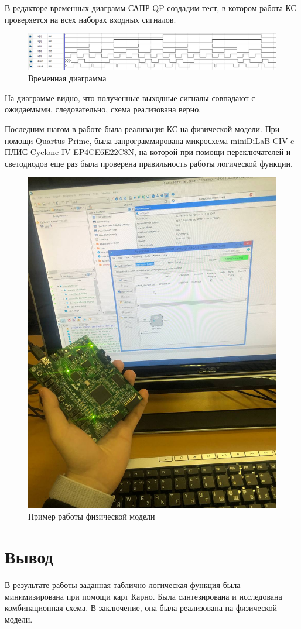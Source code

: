 \documentclass[a4paper,12pt]{article}
\begin{document}
	В редакторе временных диаграмм САПР QP создадим тест, в котором работа
	КС проверяется на всех наборах входных сигналов.
	\begin{figure}[H]
		\centering
		\includegraphics[width=\linewidth]{subfiles/images/wave}
		\caption{Временная диаграмма}
		\label{fig:wave}
	\end{figure}
	На диаграмме видно, что полученные выходные сигналы совпадают с ожидаемыми,
	следовательно, схема реализована верно. 
	
	Последним шагом в работе была реализация КС на физической модели.
	При помощи Quartus Prime, была запрограммирована микросхема
	miniDiLaB-CIV c ПЛИС Cyclone IV EP4CE6E22C8N, на которой при помощи переключателей и светодиодов 
	еще раз была проверена правильность работы логической функции.
	\begin{figure}[H]
		\centering
		\includegraphics[width=0.5\linewidth]{subfiles/images/chip}
		\caption{Пример работы физической модели}
		\label{fig:chip}
	\end{figure}
	
	\section{Вывод}
	В результате работы заданная таблично логическая функция была минимизирована при помощи карт
	Карно. Была синтезирована и исследована комбинационная схема. В заключение, она была 
	реализована на физической модели.
\end{document}

